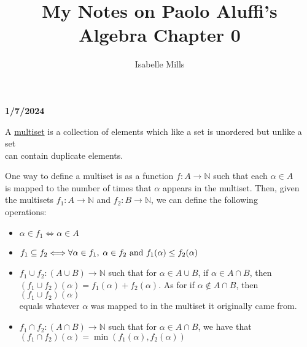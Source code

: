 \documentclass{book}
\title{My Notes on Paolo Aluffi's Algebra Chapter 0}
\author{Isabelle Mills}
\newcommand{\hOne}{%
   \color{Black}%
   \fontsize{14}{16}\selectfont%
}
\newcommand{\exOne}{%
   \color{Purple}%
   \fontsize{14}{16}\selectfont%
}
\newcommand{\exTwo}{%
   \color{RedViolet}%
   \fontsize{13}{15}\selectfont%
}
\newenvironment{myIndent}{%
   \begin{adjustwidth}{2.5em}{0em}%
}{%
   \end{adjustwidth}%
}
\newcommand{\udefine}[1]{{%
   \setulcolor{Red}%
   \setul{0.14em}{0.07em}%
   \ul{#1}%
}}
\newcommand*{\markDate}[1]{%
   {\huge \color{Black} \textbf{#1} \newline}%
}
\begin{document}
   \maketitle{}
   \setul{0.14em}{0.07em}
   \calibri

   \markDate{1/7/2024}

   \hOne
   A \udefine{multiset} is a collection of elements 
   which like a set is unordered but unlike a set\\ can
   contain duplicate elements.
   
   \begin{myIndent}
      \exOne
      One way to define a multiset is as a function
      \( f: A\rightarrow\mathbb{N} \) such that each
      \(\alpha \in A \)\\ is mapped to the number of times that 
      \(\alpha\) appears in the multiset. Then, given\\ the multisets 
      \(f_{1}: A\rightarrow \mathbb{N}\) and \(f_{2}: 
      B \rightarrow \mathbb{N}\), we can define the following\\
      operations:
      \exTwo
      \begin{itemize}
         \item \(\alpha \in f_{1} \Longleftrightarrow \alpha \in A\)\\ [-10pt]

         \item \(f_{1} \subseteq f_{2} \Longleftrightarrow 
               \forall \alpha \in f_{1}, \hspace{0.25em} \alpha \in f_{2} 
               \text{ and } f_{1}(\alpha) \leq f_{2}(\alpha)\)\\ [-12pt]

         \item \(f_{1} \cup f_{2}: (A \cup B) \longrightarrow
               \mathbb{N} \) such that for \(\alpha
               \in A \cup B\), if \(\alpha \in A \cap B \),
               then\\ \((f_{1} \cup f_{2})(\alpha) = f_{1}(\alpha)
               + f_{2}(\alpha)\). As for if \(\alpha \notin 
               A \cap B \), then \((f_{1} \cup f_{2})(\alpha)\)\\
               equals whatever $\alpha$ was mapped to 
               in the multiset it originally came from.\\ [-12pt]
         
         \item \(f_{1} \cap f_{2}: (A \cap B) \longrightarrow
               \mathbb{N} \) such that for \(\alpha
               \in A \cap B\), we have that\\
               \((f_{1} \cap f_{2})(\alpha) = \min(f_{1}(\alpha)
               , f_{2}(\alpha))\)\\ [-12pt]
         

\end{itemize}
\end{myIndent}
\end{document}
